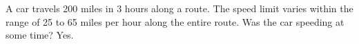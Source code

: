 {A car travels 200 miles in 3 hours along a route.  The speed limit  varies within the range of 25 to 65 miles per hour along the entire route.  Was the car speeding at some time?
}
{Yes.
}
